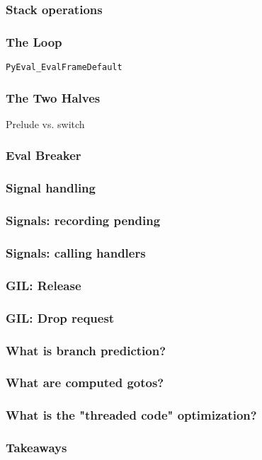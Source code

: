 \begin{frame}
\frametitle{Stack operations}
\end{frame}

\begin{frame}
\frametitle{The Loop}
\verb|PyEval_EvalFrameDefault|
\end{frame}

\begin{frame}
\frametitle{The Two Halves}
Prelude vs. switch
\end{frame}

\begin{frame}
\frametitle{Eval Breaker}
\end{frame}

\begin{frame}
\frametitle{Signal handling}
\end{frame}

\begin{frame}
\frametitle{Signals: recording pending}
\end{frame}

\begin{frame}
\frametitle{Signals: calling handlers}
\end{frame}


\begin{frame}
\end{frame}

\begin{frame}
\frametitle{GIL: Acquisition]
\end{frame}

\begin{frame}
\frametitle{GIL: Release}
\end{frame}

\begin{frame}
\frametitle{GIL: Drop request}
\end{frame}

\begin{frame}
\frametitle{What is branch prediction?}
\end{frame}

\begin{frame}
\frametitle{What are computed gotos?}
\end{frame}

\begin{frame}
\frametitle{What is the "threaded code" optimization?}
\end{frame}

\begin{frame}
\frametitle{Takeaways}
\end{frame}


